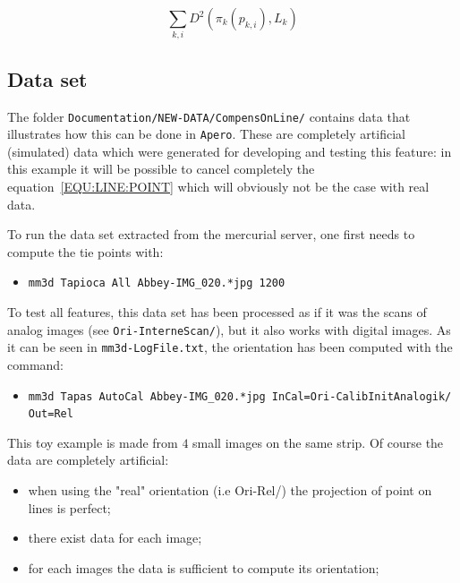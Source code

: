\begin{equation}
    \sum_{k,i} D^2 ( \pi_k(p_{k,i}),L_k) \label{EQU:LINE:POINT}
\end{equation}



\subsection{Data set}

The folder {\tt Documentation/NEW-DATA/CompensOnLine/} contains  data that illustrates how this can be done in
{\tt Apero}. These are completely artificial (simulated) data which were generated for developing and testing this feature: in this example it will be possible to cancel completely the equation~\ref{EQU:LINE:POINT} which will obviously not
be the case with real data.

To run the data set extracted from the mercurial server, one first needs to compute the tie points with:

\begin{itemize}
   \item {\tt mm3d Tapioca All Abbey-IMG\_020.*jpg 1200}
\end{itemize}

To test all features, this data set has been processed as if it was the scans of analog images
(see {\tt Ori-InterneScan/}), but it also works with digital images. As it can be seen in {\tt mm3d-LogFile.txt},
the orientation has been computed with the command:

\begin{itemize}
   \item {\tt mm3d Tapas AutoCal Abbey-IMG\_020.*jpg InCal=Ori-CalibInitAnalogik/ Out=Rel}

\end{itemize}

This toy example is made from $4$ small images on the same strip. Of course the data are completely  artificial:

\begin{itemize}
   \item when using the "real" orientation (i.e Ori-Rel/) the projection of point on lines is perfect;
   \item there exist data for each image;
   \item for each images the data is sufficient to compute its orientation;
\end{itemize}

